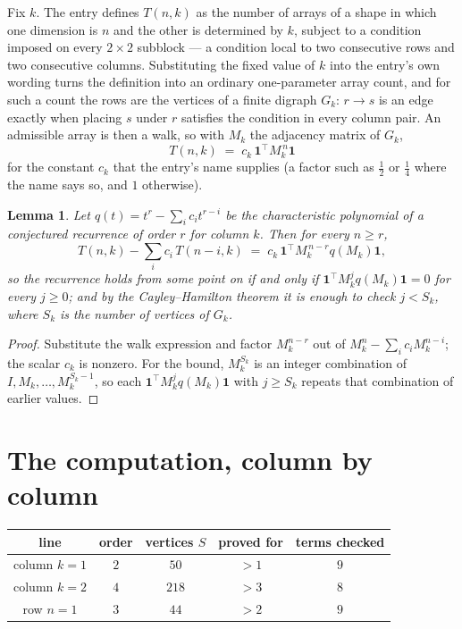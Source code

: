 \documentclass[11pt,a4paper]{article}
\theoremstyle{plain}
\newtheorem{lemma}[theorem]{Lemma}
\theoremstyle{definition}
\begin{document}
Fix $k$. The entry defines $T(n,k)$ as the number of arrays of a shape in which one dimension
is $n$ and the other is determined by $k$, subject to a condition imposed on every
$2\times2$ subblock --- a condition local to two consecutive rows and two consecutive columns.
Substituting the fixed value of $k$ into the entry's own wording turns the definition into an
ordinary one-parameter array count, and for such a count the rows are the vertices of a finite
digraph $G_k$: $r\to s$ is an edge exactly when placing $s$ under $r$ satisfies the condition
in every column pair. An admissible array is then a walk, so with $M_k$ the adjacency matrix
of $G_k$,
\[
T(n,k)\;=\;c_k\,\mathbf{1}^{\!\top}M_k^{\,n}\mathbf{1}
\]
for the constant $c_k$ that the entry's name supplies (a factor such as $\tfrac12$ or
$\tfrac14$ where the name says so, and $1$ otherwise).

\begin{lemma}\label{lem:crit}
Let $q(t)=t^{r}-\sum_i c_it^{r-i}$ be the characteristic polynomial of a conjectured
recurrence of order $r$ for column $k$. Then for every $n\ge r$,
\[
T(n,k)-\sum_i c_i\,T(n-i,k)\;=\;c_k\,\mathbf{1}^{\!\top}M_k^{\,n-r}q(M_k)\mathbf{1},
\]
so the recurrence holds from some point on if and only if
$\mathbf{1}^{\!\top}M_k^{j}q(M_k)\mathbf{1}=0$ for every $j\ge0$; and by the
Cayley--Hamilton theorem it is enough to check $j<S_k$, where $S_k$ is the number of vertices
of $G_k$.
\end{lemma}

\begin{proof}
Substitute the walk expression and factor $M_k^{n-r}$ out of $M_k^{n}-\sum_ic_iM_k^{n-i}$;
the scalar $c_k$ is nonzero. For the bound, $M_k^{S_k}$ is an integer combination of
$I,M_k,\dots,M_k^{S_k-1}$, so each $\mathbf{1}^{\!\top}M_k^{j}q(M_k)\mathbf{1}$ with
$j\ge S_k$ repeats that combination of earlier values.
\end{proof}

\section{The computation, column by column}

\begin{center}
\begin{tabular}{ccccc}
line & order & vertices $S$ & proved for & terms checked \\ \hline
column $k$$=1$ & $2$ & $50$ & $>1$ & $9$ \\
column $k$$=2$ & $4$ & $218$ & $>3$ & $8$ \\
row $n$$=1$ & $3$ & $44$ & $>2$ & $9$ \\
\end{tabular}
\end{center}
\end{document}
